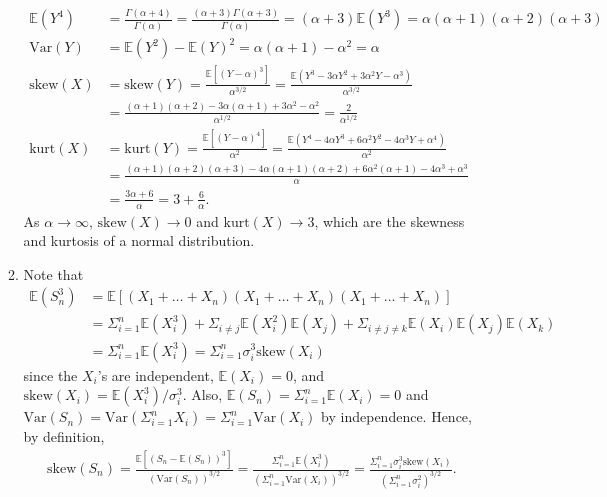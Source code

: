 \documentclass[12pt]{article}
\newcommand{\E}{\mathbb{E}}
\newcommand{\V}{\text{Var}}
\begin{document}
\begin{enumerate}
\begin{enumerate}
\begin{align*}
            \E(Y^4) &= \frac{\Gamma(\alpha+4)}{\Gamma(\alpha)} = \frac{(\alpha+3)\Gamma(\alpha+3)}{\Gamma(\alpha)} = (\alpha+3)\E(Y^3) = \alpha(\alpha+1)(\alpha+2)(\alpha+3)\\
            \V(Y) &= \E(Y^2) - \E(Y)^2 = \alpha(\alpha+1) - \alpha^2 = \alpha\\
            \text{skew}(X) &= \text{skew}(Y) = \frac{\E[(Y-\alpha)^3]}{\alpha^{3/2}} = \frac{\E(Y^3 - 3\alpha Y^2 + 3\alpha^2 Y - \alpha^3)}{\alpha^{3/2}}\\
            &= \frac{(\alpha+1)(\alpha+2) - 3\alpha(\alpha+1) + 3\alpha^2 - \alpha^2}{\alpha^{1/2}} = \frac{2}{\alpha^{1/2}}\\
            \text{kurt}(X) &= \text{kurt}(Y) = \frac{\E[(Y-\alpha)^4]}{\alpha^2} = \frac{\E(Y^4 - 4\alpha Y^3 + 6\alpha^2 Y^2 - 4\alpha^3 Y + \alpha^4)}{\alpha^2}\\
            &= \frac{(\alpha+1)(\alpha+2)(\alpha+3) - 4\alpha(\alpha+1)(\alpha+2) + 6\alpha^2(\alpha+1) - 4\alpha^3 + \alpha^3}{\alpha}\\
            &= \frac{3\alpha + 6}{\alpha} = 3 + \frac{6}{\alpha}.
        \end{align*} As $\alpha\to\infty$, $\text{skew}(X)\to 0$ and $\text{kurt}(X)\to 3$, which are the skewness and kurtosis of a normal distribution.
        \item Note that
        \begin{align*}
            \E(S_n^3) &= \E[(X_1 + \ldots + X_n)(X_1 + \ldots + X_n)(X_1 + \ldots + X_n)]\\
            &= \Sigma_{i=1}^n \E(X_i^3) + \Sigma_{i\neq j} \E(X_i^2)\E(X_j) + \Sigma_{i\neq j\neq k} \E(X_i)\E(X_j)\E(X_k)\\
            &= \Sigma_{i=1}^n \E(X_i^3) = \Sigma_{i=1}^n \sigma_i^3\text{skew}(X_i)
        \end{align*} since the $X_i$'s are independent, $\E(X_i) = 0$, and $\text{skew}(X_i) = \E(X_i^3)/\sigma_i^3$. Also, $\E(S_n) = \Sigma_{i=1}^n \E(X_i) = 0$ and $\V(S_n) = \V(\Sigma_{i=1}^n X_i) = \Sigma_{i=1}^n \V(X_i)$ by independence. Hence, by definition,
    \begin{align*}
        \text{skew}(S_n) = \frac{\E[(S_n-\E(S_n))^3]}{(\V(S_n))^{3/2}} = \frac{\Sigma_{i=1}^n\E(X_i^3)}{(\Sigma_{i=1}^n \V(X_i))^{3/2}} = \frac{\Sigma_{i=1}^n \sigma_i^3\text{skew}(X_i)}{(\Sigma_{i=1}^n \sigma_i^2)^{3/2}}.
    \end{align*}
    \end{enumerate}
\end{enumerate}
\end{document}
